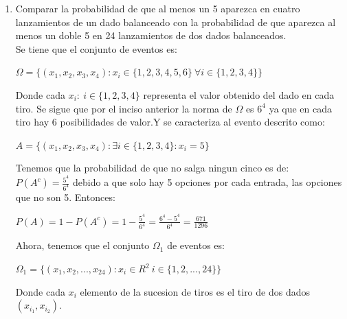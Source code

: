 \documentclass[12pt,a4paper]{report}
\begin{document}
\begin{enumerate}
{\begin{enumerate}[label=\alph*) ]
{\begin{center}
$9=6+2+1=5+3+1=4+4+1=3+3+3=2+4+3=5+2+2$
\end{center}
Y la terna (3,3,3) tiene una unica forma de representarse por lo tanto:\\
\begin{center}
$||B||= 6(3!)-3-5-3=36-11=25$
\end{center}
Se le resta -3 a las ternas con dos elementos iguales y -5 a la terna con todos sus elementos iguales por lo tanto la probabilidad de B es:\\
\begin{center}
$P(B)=\frac{||B||}{||\Omega||}=\frac{25}{216}$
\end{center}
    }
    \item{Comparar la probabilidad de que al menos un 5 aparezca en cuatro lanzamientos de un dado balanceado con la probabilidad de que aparezca al menos un doble 5 en 24 lanzamientos de dos dados balanceados.\\
    Se tiene que el conjunto de eventos es:\\
    \begin{center}
    $\Omega = \lbrace (x_{1},x_{2},x_{3},x_{4}): x_{i}\in \lbrace 1,2,3,4,5,6 \rbrace \ \forall i\in \lbrace 1,2,3,4 \rbrace \rbrace$
    \end{center}
    Donde cada $x_{i}: \ i\in \lbrace 1,2,3,4 \rbrace$ representa el valor obtenido del dado en cada tiro. Se sigue que por el inciso anterior la norma de $\Omega$ es $6^4$ ya que en cada tiro hay 6 posibilidades de valor.Y se caracteriza al evento descrito como:\\
    \begin{center}
    $A= \lbrace (x_{1},x_{2},x_{3},x_{4}): \exists i\in \lbrace 1,2,3,4 \rbrace : x_{i}=5 \rbrace$
    \end{center}
Tenemos que la probabilidad de que no salga ningun cinco es de: $P(A^c)=\frac{5^4}{6^4}$ debido a que solo hay 5 opciones por cada entrada, las opciones que no son 5. Entonces:\\
\begin{center}
$P(A)=1-P(A^c)=1-\frac{5^4}{6^4}=\frac{6^4-5^4}{6^4}=\frac{671}{1296} $
\end{center}
Ahora, tenemos que el conjunto $\Omega_{1}$ de eventos es:\\
\begin{center}
$\Omega_{1} = \lbrace (x_{1},x_{2},...,x_{24}) : x_{i}\in R^2 \ i \in  \lbrace 1,2,...,24 \rbrace \rbrace$
\end{center}
Donde cada $x_{i}$ elemento de la sucesion de tiros es el tiro de dos dados $(x_{i_{1}},x_{i_{2}})$.
}
\end{enumerate}}
\end{enumerate}
\end{document}
